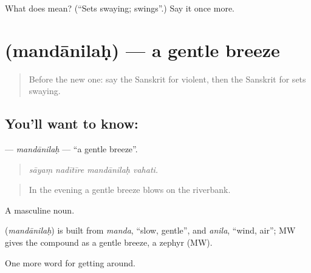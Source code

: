 \begin{tcolorbox}[breakable,colback=teal!4,colframe=teal!35!black,title={Before you move on}]
What does  mean? (\textquotedblleft{}Sets swaying; swings\textquotedblright{}.) Say it once more.
\end{tcolorbox}
\section[\texorpdfstring{\sk{मन्दानिलः} (mandānilaḥ)}{मन्दानिलः (mandānilaḥ)}]{ (mandānilaḥ) — a gentle breeze}

\label{lesson:SA-C439-mandanilah}



\begin{quote}
Before the new one: say the Sanskrit for violent, then the Sanskrit for sets swaying.
\end{quote}

\subsection*{You'll want to know: }
\textbf{} — \emph{mandānilaḥ} — \textquotedblleft{}a gentle breeze\textquotedblright{}.

\begin{quote}
   
\end{quote}

\begin{quote}
\emph{sāyaṃ nadītīre mandānilaḥ vahati.}
\end{quote}

\begin{quote}
In the evening a gentle breeze blows on the riverbank.
\end{quote}

A masculine noun.

\begin{cousinweb}
\textbf{} (\emph{mandānilaḥ}) is built from \emph{manda}, \textquotedblleft{}slow, gentle\textquotedblright{}, and \emph{anila}, \textquotedblleft{}wind, air\textquotedblright{}; MW gives the compound as a gentle breeze, a zephyr (MW).
\end{cousinweb}

\begin{grammarlens}[title={What you've built}]
One more word for getting around.
\end{grammarlens}

